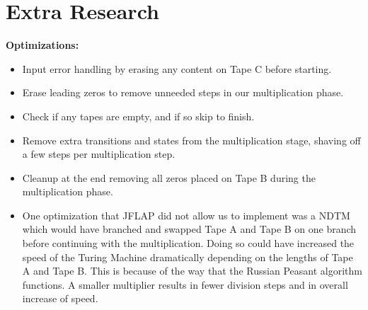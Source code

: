 \documentclass{article}
\begin{document}
\section*{Extra Research}
{\bf Optimizations:}
\begin{itemize}
	\item Input error handling by erasing any content on Tape C before starting.
	\item Erase leading zeros to remove unneeded steps in our multiplication phase.
	\item Check if any tapes are empty, and if so skip to finish.
	\item Remove extra transitions and states from the multiplication stage, shaving off a few steps per multiplication step.
	\item Cleanup at the end removing all zeros placed on Tape B during the multiplication phase.
	\item One optimization that JFLAP did not allow us to implement was a NDTM which would have branched and swapped Tape A and Tape B on one branch before continuing with the multiplication. Doing so could have increased the speed of the Turing Machine dramatically depending on the lengths of Tape A and Tape B. This is because of the way that the Russian Peasant algorithm functions. A smaller multiplier results in fewer division steps and in overall increase of speed.
	\\
\end{itemize}
\end{document}
